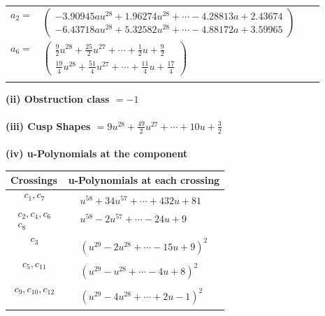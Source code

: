 \documentclass[1p]{elsarticle_modified}
\theoremstyle{definition}
\begin{document}
\begin{tabular}{m{7pt} m{180pt} m{7pt} m{180pt} }
\flushright $a_{2}=$&$\begin{pmatrix}-3.90945 a u^{28}+1.96274 u^{28}+\cdots-4.28813 a+2.43674\\-6.43718 a u^{28}+5.32582 u^{28}+\cdots-4.88172 a+3.59965\end{pmatrix}$ \\
\flushright $a_{6}=$&$\begin{pmatrix}\frac{9}{2} u^{28}+\frac{25}{2} u^{27}+\cdots+\frac{1}{2} u+\frac{9}{2}\\\frac{19}{4} u^{28}+\frac{51}{4} u^{27}+\cdots+\frac{11}{4} u+\frac{17}{4}\end{pmatrix}$\\&\end{tabular}
\flushleft \textbf{(ii) Obstruction class $= -1$}\\~\\
\flushleft \textbf{(iii) Cusp Shapes $= 9 u^{28}+\frac{49}{2} u^{27}+\cdots+10 u+\frac{3}{2}$}\\~\\
\newpage\renewcommand{\arraystretch}{1}
\flushleft \textbf{(iv) u-Polynomials at the component}\newline \\
\begin{tabular}{m{50pt}|m{274pt}}
Crossings & \hspace{64pt}u-Polynomials at each crossing \\
\hline $$\begin{aligned}c_{1},c_{7}\end{aligned}$$&$\begin{aligned}
&u^{58}+34 u^{57}+\cdots+432 u+81
\end{aligned}$\\
\hline $$\begin{aligned}c_{2},c_{4},c_{6}\\c_{8}\end{aligned}$$&$\begin{aligned}
&u^{58}-2 u^{57}+\cdots-24 u+9
\end{aligned}$\\
\hline $$\begin{aligned}c_{3}\end{aligned}$$&$\begin{aligned}
&(u^{29}-2 u^{28}+\cdots-15 u+9)^{2}
\end{aligned}$\\
\hline $$\begin{aligned}c_{5},c_{11}\end{aligned}$$&$\begin{aligned}
&(u^{29}- u^{28}+\cdots-4 u+8)^{2}
\end{aligned}$\\
\hline $$\begin{aligned}c_{9},c_{10},c_{12}\end{aligned}$$&$\begin{aligned}
&(u^{29}-4 u^{28}+\cdots+2 u-1)^{2}
\end{aligned}$\\
\hline
\end{tabular}\\~\\
\end{document}
